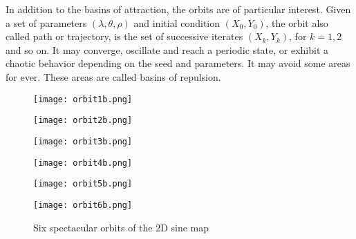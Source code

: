 \documentclass[oneside,10pt]{book}
\begin{document}
In addition to the basins of attraction, the \textcolor{index}{orbits} are of particular interest.
 Given a set of parameters $(\lambda,\theta,\rho)$ and initial condition $(X_0, Y_0)$, the orbit also called path or trajectory,
 is the set of successive iterates $(X_k,Y_k)$, for $k=1,2$ and so on. It may converge, oscillate and reach a periodic state, or exhibit a chaotic behavior depending on the seed and parameters. It may avoid some areas for ever. These
 areas are called \textcolor{index}{basins of repulsion}.





\begin{figure}[H]
\centering
\begin{minipage}{.5\textwidth}
  \centering
  \texttt{[image: orbit1b.png]}
\end{minipage}%
\begin{minipage}{.5\textwidth}
  \centering
  \texttt{[image: orbit2b.png]}
\end{minipage}
\end{figure}

\begin{figure}[H]
\centering
\begin{minipage}{.5\textwidth}
  \centering
  \texttt{[image: orbit3b.png]}
\end{minipage}%
\begin{minipage}{.5\textwidth}
  \centering
  \texttt{[image: orbit4b.png]}
\end{minipage}
\end{figure}

\begin{figure}[H]
\centering
\begin{minipage}{.5\textwidth}
  \centering
  \texttt{[image: orbit5b.png]}
\end{minipage}%
\begin{minipage}{.5\textwidth}
  \centering
  \texttt{[image: orbit6b.png]}
\end{minipage}
\caption{Six spectacular orbits of the 2D sine map}
\label{fig:b6b4c9u6}
\end{figure}
\end{document}
